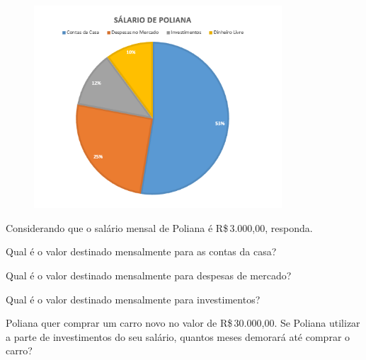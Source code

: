 {{{\begin{figure}[H]
\centering\includegraphics[width=3.65in,height=2.98179in]{./imgSAEB_8_MAT/media/image41.png}
\end{figure}

Considerando que o salário mensal de Poliana é R\$\,3.000,00, responda.

\begin{escolha}[itemsep=0pt]
\item Qual é o valor destinado mensalmente para as contas da casa?

    
    

\item Qual é o valor destinado mensalmente para despesas de mercado?




\item Qual é o valor destinado mensalmente para investimentos?




\item Poliana quer comprar um carro novo no valor de R\$\,30.000,00.
Se Poliana utilizar a parte de investimentos do seu salário, quantos meses
demorará até comprar o carro?


\end{escolha}}}}
